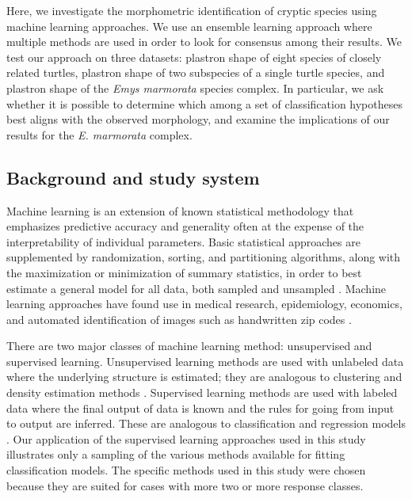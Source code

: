 \documentclass[fleqn,10pt,lineno]{wlpeerj} %
\begin{document}
Here, we investigate the morphometric identification of cryptic species using machine learning approaches. We use an ensemble learning approach where multiple methods are used in order to look for consensus among their results. We test our approach on three datasets: plastron shape of eight species of closely related turtles, plastron shape of two subspecies of a single turtle species, and plastron shape of the \textit{Emys marmorata} species complex. In particular, we ask whether it is possible to determine which among a set of classification hypotheses best aligns with the observed morphology, and examine the implications of our results for the \textit{E. marmorata} complex. 

\subsection*{Background and study system}
Machine learning is an extension of known statistical methodology \citep{Hastie2009} that emphasizes predictive accuracy and generality often at the expense of the interpretability of individual parameters. Basic statistical approaches are supplemented by randomization, sorting, and partitioning algorithms, along with the maximization or minimization of summary statistics, in order to best estimate a general model for all data, both sampled and unsampled \citep{Hastie2009}. Machine learning approaches have found use in medical research, epidemiology, economics, and automated identification of images such as handwritten zip codes \citep{Hastie2009}. %

There are two major classes of machine learning method: unsupervised and supervised learning. Unsupervised learning methods are used with unlabeled data where the underlying structure is estimated; they are analogous to clustering and density estimation methods \citep{Kaufman1990}. Supervised learning methods are used with labeled data where the final output of data is known and the rules for going from input to output are inferred. These are analogous to classification and regression models \citep{Breiman1984,Hastie2009}. Our application of the supervised learning approaches used in this study illustrates only a sampling of the various methods available for fitting classification models. The specific methods used in this study were chosen because they are suited for cases with more two or more response classes.
\end{document}
